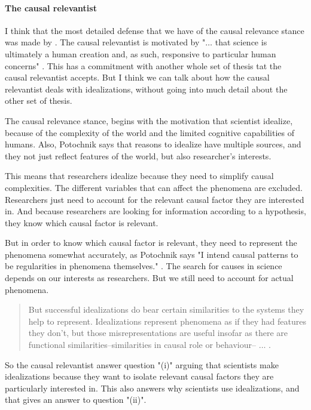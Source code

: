 \paragraph{The causal relevantist}

I think that the most detailed defense that we have of the causal relevance stance was made by \cite{Potochnik2017-POTIAT-3}.
The causal relevantist is motivated by "$\ldots$ that science is ultimately a human creation and, as such, responsive to particular human concerns" \parencite[][p. 11]{Potochnik2017-POTIAT-3}.
This has a commitment with another whole set of thesis tat the causal relevantist accepts.
But I think we can talk about how the causal relevantist deals with idealizations, without going into much detail about the other set of thesis.

The causal relevance stance, begins with the motivation that scientist idealize, because of the complexity of the world and the limited cognitive capabilities of humans.
Also, Potochnik says that reasons to idealize have multiple sources, and they not just reflect features of the world, but also researcher's interests.

This means that researchers idealize because they need to simplify causal complexities.
The different variables that can affect the phenomena are excluded.
Researchers just need to account for the relevant causal factor they are interested in.
And because researchers are looking for information according to a hypothesis, they know which causal factor is relevant.

But in order to know which causal factor is relevant, they need to represent the phenomena somewhat accurately, as Potochnik says "I intend causal patterns to be regularities in phenomena themselves." \parencite[][p. 25]{Potochnik2017-POTIAT-3}.
The search for causes in science depends on our interests as researchers.
But we still need to account for actual phenomena.

\begin{quote}
	But successful idealizations do bear certain similarities to the systems they help to represent.
	Idealizations represent phenomena as if they had features they don't, but those misrepresentations are useful insofar as there are functional similarities--similarities in causal role or behaviour-- $\ldots$ \parencite[][p. 53]{Potochnik2017-POTIAT-3}.
\end{quote}

So the causal relevantist answer question "(i)" arguing that scientists make idealizations because they want to isolate relevant causal factors they are particularly interested in.
This also answers why scientists use idealizations, and that gives an answer to question "(ii)".

